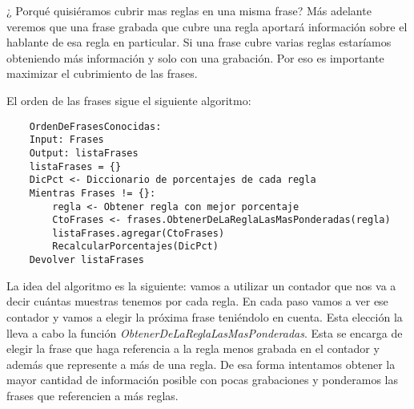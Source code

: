 ¿ Porqué quisiéramos cubrir mas reglas en una misma frase? Más adelante veremos que una frase grabada que cubre una regla aportará información sobre el hablante de esa regla en particular. Si una frase cubre varias reglas estaríamos obteniendo más información y solo con una grabación. Por eso es importante maximizar el cubrimiento de las frases.  

El orden de las frases sigue el siguiente algoritmo:

\begin{lstlisting}
    OrdenDeFrasesConocidas:
    Input: Frases
    Output: listaFrases 
    listaFrases = {}
    DicPct <- Diccionario de porcentajes de cada regla
    Mientras Frases != {}:
    	regla <- Obtener regla con mejor porcentaje
    	CtoFrases <- frases.ObtenerDeLaReglaLasMasPonderadas(regla)
    	listaFrases.agregar(CtoFrases)
    	RecalcularPorcentajes(DicPct)
    Devolver listaFrases
\end{lstlisting}

La idea del algoritmo es la siguiente: vamos a utilizar un contador que nos va a decir cuántas muestras tenemos por cada regla. En cada paso vamos a ver ese contador y vamos a elegir la próxima frase teniéndolo en cuenta. Esta elección la lleva a cabo la función \textit{ObtenerDeLaReglaLasMasPonderadas}. Esta se encarga de elegir la frase que haga referencia a la regla menos grabada en el contador y además que represente a más de una regla. De esa forma intentamos obtener la mayor cantidad de información posible con pocas grabaciones y ponderamos las frases que referencien a más reglas. 


